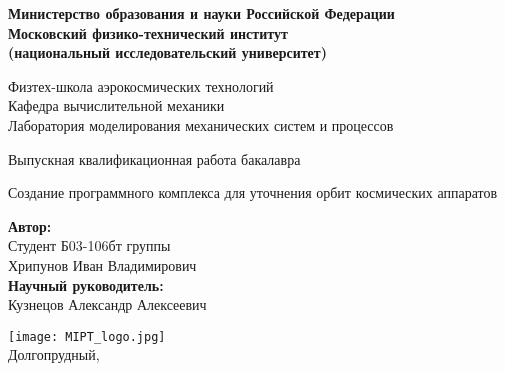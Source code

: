 \begin{center}
    \large\textbf{Министерство образования и науки Российской Федерации \\
    Московский физико-технический институт \\
    (национальный исследовательский университет)} \\
    \vspace{1cm}

    Физтех-школа аэрокосмических технологий \\

    Кафедра вычислительной механики \\
    Лаборатория моделирования механических систем и процессов\\

    \vspace{3em}

    Выпускная квалификационная работа бакалавра
\end{center}

\begin{center}
    \vspace{\fill}
    \LARGE{Создание программного комплекса для уточнения орбит космических аппаратов}

    \vspace{\fill}
\end{center}


\begin{flushright}
    \textbf{Автор:} \\
    Студент Б03-106бт группы \\
    Хрипунов Иван Владимирович \\
    \vspace{2em}
    \textbf{Научный руководитель:} \\
    Кузнецов Александр Алексеевич \\
    \vspace{2em}
\end{flushright}

\vspace{7em}

\begin{center}
    \texttt{[image: MIPT\_logo.jpg]}\\
    Долгопрудный, \the\year{}
\end{center}

\thispagestyle{empty}

\newpage
\setcounter{page}{2}
